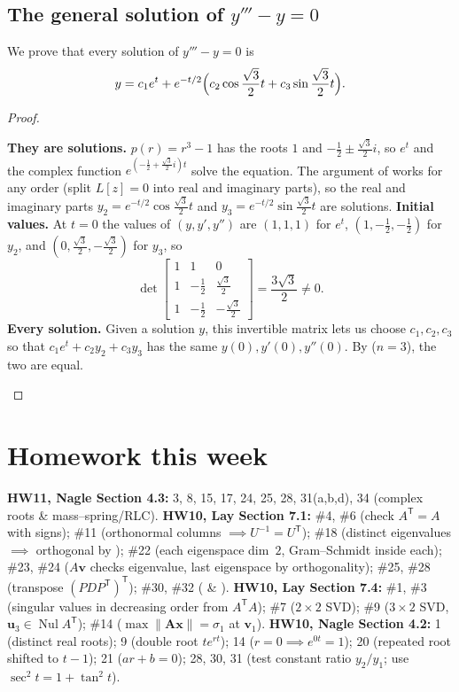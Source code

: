 \documentclass[10pt]{scrartcl}
\newcommand{\vv}[1]{\mathbf{#1}}
\DeclareMathOperator{\Nul}{Nul}
\begin{document}
\subsection{The general solution of $y'''-y=0$}
We prove that every solution of $y'''-y=0$ is
\[
  y=c_1e^t+e^{-t/2}\Bigl(c_2\cos\frac{\sqrt3}{2}t+c_3\sin\frac{\sqrt3}{2}t\Bigr).
\]
\begin{proof}
  \begin{steps}
    \ii \textbf{They are solutions.} $p(r)=r^3-1$ has the roots $1$ and $-\frac12\pm\frac{\sqrt3}{2}i$, so $e^t$ and the complex function $e^{(-\frac12+\frac{\sqrt3}{2}i)t}$ solve the equation. The argument of  works for any order (split $L[z]=0$ into real and imaginary parts), so the real and imaginary parts $y_2=e^{-t/2}\cos\frac{\sqrt3}{2}t$ and $y_3=e^{-t/2}\sin\frac{\sqrt3}{2}t$ are solutions.
    \ii \textbf{Initial values.} At $t=0$ the values of $(y,y',y'')$ are $(1,1,1)$ for $e^t$, $(1,-\tfrac12,-\tfrac12)$ for $y_2$, and $(0,\tfrac{\sqrt3}{2},-\tfrac{\sqrt3}{2})$ for $y_3$, so
    \[
      \det\begin{bmatrix}1&1&0\\1&-\frac12&\frac{\sqrt3}{2}\\1&-\frac12&-\frac{\sqrt3}{2}\end{bmatrix}=\frac{3\sqrt3}{2}\neq 0.
    \]
    \ii \textbf{Every solution.} Given a solution $y$, this invertible matrix lets us choose $c_1,c_2,c_3$ so that $c_1e^t+c_2y_2+c_3y_3$ has the same $y(0),y'(0),y''(0)$. By  ($n=3$), the two are equal. \qedhere
  \end{steps}
\end{proof}

\section{Homework this week}
\begin{itemize}
  \ii \textbf{HW11, Nagle Section 4.3:} 3, 8, 15, 17, 24, 25, 28, 31(a,b,d), 34 (complex roots \& mass--spring/RLC).
  \ii \textbf{HW10, Lay Section 7.1:} \#4, \#6 (check $A^{\mathsf T}=A$ with signs); \#11 (orthonormal columns $\implies U^{-1}=U^{\mathsf T}$); \#18 (distinct eigenvalues $\implies$ orthogonal by ); \#22 (each eigenspace dim~$2$, Gram--Schmidt inside each); \#23, \#24 ($A\vv v$ checks eigenvalue, last eigenspace by orthogonality); \#25, \#28 (transpose $(PDP^{\mathsf T})^{\mathsf T}$); \#30, \#32 ( \& ).
  \ii \textbf{HW10, Lay Section 7.4:} \#1, \#3 (singular values in decreasing order from $A^{\mathsf T}A$); \#7 ($2\times 2$ SVD); \#9 ($3\times 2$ SVD, $\vv u_3\in\Nul A^{\mathsf T}$); \#14 ($\max\|\vv{Ax}\|=\sigma_1$ at $\vv v_1$).
  \ii \textbf{HW10, Nagle Section 4.2:} 1 (distinct real roots); 9 (double root $te^{rt}$); 14 ($r=0\implies e^{0t}=1$); 20 (repeated root shifted to $t-1$); 21 ($ar+b=0$); 28, 30, 31 (test constant ratio $y_2/y_1$; use $\sec^2t=1+\tan^2t$).
\end{itemize}
\end{document}
